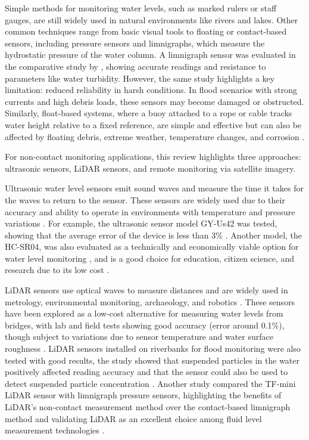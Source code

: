 \documentclass[conference]{IEEEtran}
\begin{document}
Simple methods for monitoring water levels, such as marked rulers or staff gauges, are still widely used in natural environments like rivers and lakes. Other common techniques range from basic visual tools to floating or contact-based sensors, including pressure sensors and limnigraphs, which measure the hydrostatic pressure of the water column. A limnigraph sensor was evaluated in the comparative study by \cite{santana_2024_development}, showing accurate readings and resistance to parameters like water turbidity. However, the same study highlights a key limitation: reduced reliability in harsh conditions. In flood scenarios with strong currents and high debris loads, these sensors may become damaged or obstructed. Similarly, float-based systems, where a buoy attached to a rope or cable tracks water height relative to a fixed reference, are simple and effective but can also be affected by floating debris, extreme weather, temperature changes, and corrosion \cite{mohammadrezamasoudimoghaddam_2024_a, santana_2024_development, paul_2020_a, yukawa_2025_an}.

For non-contact monitoring applications, this review highlights three approaches: ultrasonic sensors, LiDAR sensors, and remote monitoring via satellite imagery.

Ultrasonic water level sensors emit sound waves and measure the time it takes for the waves to return to the sensor. These sensors are widely used due to their accuracy and ability to operate in environments with temperature and pressure variations \cite{mohammadrezamasoudimoghaddam_2024_a, pereira_2022_evaluation}. For example, the ultrasonic sensor model GY-Us42 was tested, showing that the average error of the device is less than 3\% \cite{mohammadrezamasoudimoghaddam_2024_a}. Another model, the HC-SR04, was also evaluated as a technically and economically viable option for water level monitoring \cite{pereira_2022_evaluation}, and is a good choice for education, citizen science, and research due to its low cost \cite{bresnahan_2023_a}.

LiDAR sensors use optical waves to measure distances and are widely used in metrology, environmental monitoring, archaeology, and robotics \cite{behroozpour_2017_lidar, li_2022_a}.
These sensors have been explored as a low-cost alternative for measuring water levels from bridges, with lab and field tests showing good accuracy (error around 0.1\%), though subject to variations due to sensor temperature and water surface roughness \cite{paul_2020_a}. LiDAR sensors installed on riverbanks for flood monitoring were also tested with good results, the study showed that suspended particles in the water positively affected reading accuracy and that the sensor could also be used to detect suspended particle concentration \cite{tamari_2016_flash}. Another study compared the TF-mini LiDAR sensor with limnigraph pressure sensors, highlighting the benefits of LiDAR’s non-contact measurement method over the contact-based limnigraph method and validating LiDAR as an excellent choice among fluid level measurement technologies \cite{santana_2024_development}.
\end{document}
